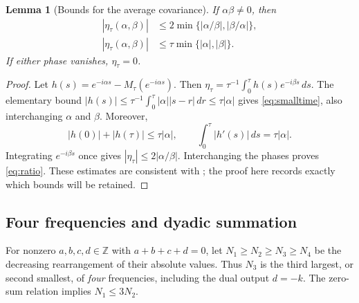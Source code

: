 \documentclass[11pt]{article}
\newtheorem{lemma}[theorem]{Lemma}
\theoremstyle{remark}\newtheorem{remark}[theorem]{Remark}
\newcommand{\Z}{\mathbb Z}
\newcommand{\abs}[1]{\left|#1\right|}
\begin{document}
\begin{lemma}[Bounds for the average covariance]\label{lem:eta}
If $\alpha\beta\ne0$, then
\begin{align}
\abs{\eta_\tau(\alpha,\beta)}&\leq2\min\{\abs{\alpha/\beta},\abs{\beta/\alpha}\},\label{eq:ratio}\\
\abs{\eta_\tau(\alpha,\beta)}&\leq\tau\min\{\abs\alpha,\abs\beta\}.\label{eq:smalltime}
\end{align}
If either phase vanishes, $\eta_\tau=0$.
\end{lemma}
\begin{proof}
Let $h(s)=e^{-i\alpha s}-M_\tau(e^{-i\alpha s})$. Then
$\eta_\tau=\tau^{-1}\int_0^\tau h(s)e^{-i\beta s}\,ds$.
The elementary bound
$\abs{h(s)}\leq\tau^{-1}\int_0^\tau\abs\alpha\abs{s-r}\,dr
\leq\tau\abs\alpha$ gives \eqref{eq:smalltime}, also interchanging
$\alpha$ and $\beta$. Moreover,
\[
\abs{h(0)}+\abs{h(\tau)}\leq\tau\abs\alpha,
\qquad \int_0^\tau\abs{h'(s)}\,ds=\tau\abs\alpha.
\]
Integrating $e^{-i\beta s}$ once gives
$\abs{\eta_\tau}\leq2\abs{\alpha/\beta}$.
Interchanging the phases proves \eqref{eq:ratio}. These estimates are
consistent with \cite[Lemma~3.2]{LW}; the proof here records exactly which
bounds will be retained.
\end{proof}

\subsection{Four frequencies and dyadic summation}
For nonzero $a,b,c,d\in\Z$ with $a+b+c+d=0$, let
$N_1\geq N_2\geq N_3\geq N_4$ be the decreasing rearrangement of their
absolute values. Thus $N_3$ is the third largest, or second smallest, of
\emph{four} frequencies, including the dual output $d=-k$.
The zero-sum relation implies $N_1\leq3N_2$.
\end{document}
